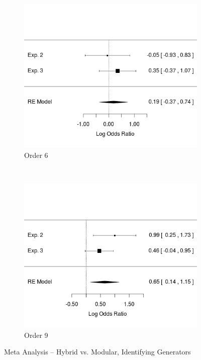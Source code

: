 \documentclass[11pt]{article}
\begin{document}
\begin{figure}[H]
\centering
\begin{subfigure}[c]{0.4\textwidth}
\centering
\includegraphics[width=\textwidth]{figures/meta/h_gen_T_6.png}
\caption{Order 6}
\end{subfigure}
~
\begin{subfigure}[c]{0.4\textwidth}
\centering
\includegraphics[width=\textwidth]{figures/meta/h_gen_T_9.png}
\caption{Order 9}
\end{subfigure}
\caption{Meta Analysis -- Hybrid vs. Modular, Identifying Generators}
\label{meta_genT_h}
\end{figure}\noindent 
\end{document}
